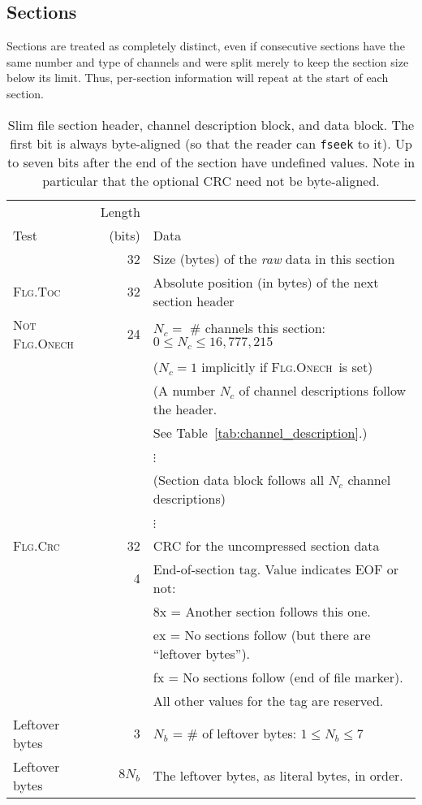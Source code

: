 \documentclass[11pt]{article}
\newcommand{\FLGTOC}{\textsc{Flg.Toc}}
\newcommand{\FLGCRC}{\textsc{Flg.Crc}}
\newcommand{\FLGONECH}{\textsc{Flg.Onech}}
\begin{document}
\subsection{Sections}
\label{sec:sections}
Sections are treated as completely distinct, even if consecutive
sections have the same number and type of channels and were split
merely to keep the section size below its limit.  Thus, per-section
information will repeat at the start of each section.

\begin{table}[h]
  \centering
  \begin{tabular}{lrl}
    & Length  & \\
    Test & (bits) & Data \\ \hline
    & 32 & Size (bytes) of the \emph{raw} data in this section \\
    { \FLGTOC} & 32 & Absolute position (in bytes) of
    the next section header \\
    {\textsc{Not} \FLGONECH} & 24 &  $N_c =$ \# channels this section:
    $0\le N_c \le 16,777,215$ \\ 
    & & ($N_c=1$ implicitly if \FLGONECH\ is set) \\\hline
    & & (A number $N_c$ of channel descriptions follow the header. \\ 
    & & See Table~\ref{tab:channel_description}.) \\ 
    & & \hfill$\vdots$\hfill\ \\ \hline
    & & (Section data block follows all $N_c$ channel descriptions) \\
    & & \hfill$\vdots$\hfill\ \\ \hline
   {\FLGCRC} & 32 & CRC for the uncompressed section
    data \\
    & 4 & End-of-section tag. Value indicates EOF or not: \\ 
    & & 8x = Another section follows this one. \\
    & & ex = No sections follow (but there are ``leftover bytes''). \\
    & & fx = No sections follow (end of file marker). \\
    & & All other values for the tag are reserved.\\
    Leftover bytes & 3 & $N_b$ = \# of leftover bytes: $1\le N_b\le 7$ \\
    Leftover bytes & $8N_b$ & The leftover bytes, as literal bytes, in
    order.\\
    \hline 
  \end{tabular}
  \caption{
    \label{tab:section_header}
    Slim file section header, channel description block, and data
    block.  The first bit is always byte-aligned (so that the reader
    can {\tt fseek} to it).  Up to seven bits after the end of the
    section have undefined values.  Note in particular that the
    optional CRC need not be byte-aligned.}
\end{table}
\end{document}
